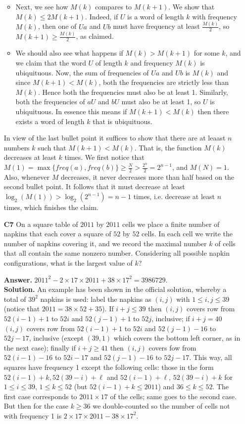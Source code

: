 \documentclass[11pt,a4paper]{article}
\begin{document}
\begin{enumerate}
\begin{itemize}
		\item Next, we see how $M(k)$ compares to $M(k+1)$. We show that $M(k)\le 2M(k+1)$. Indeed, if $U$ is a word of length $k$ with frequency $M(k)$, then one of $Ua$ and $Ub$ must have frequency at least $\frac{M(k)}{2}$, so $M(k+1)\ge \frac{M(k)}{2}$, as claimed. 
		
		\item We should also see what happens if $M(k)>M(k+1)$ for some $k$, and we claim that the word $U$ of length $k$ and frequency $M(k)$ is ubiquituous. Now, the sum of frequencies of $Ua$ and $Ub$ is $M(k)$ and since $M(k+1)<M(k)$, both the frequencies are strictly less than $M(k)$. 
		Hence both the frequencies must also be at least 1. Similarly, both the frequencies of $aU$ and $bU$ must also be at least 1, so $U$ is ubiquituous. In essence this means if $M(k+1)<M(k)$ then there exists a word of length $k$ that is ubiquituous. 
		
	\end{itemize}
	In view of the last bullet point it suffices to show that there are at leaast $n$ numbers $k$ such that $M(k+1)<M(k)$. That is, the function $M(k)$ decreases at least $k$ times. We first notice that $M(1)=\max \{freq(a), freq(b)\}\ge \frac{N}{2}>\frac{2^n}{2}=2^{n-1}$, and $M(N)=1$. Also, whenever $M$ decreases, it never decreases more than half based on the second bullet point. It follows that it must decrease at least $\log_2(M(1))>\log_2(2^{n-1})=n-1$ times, i.e. decrease at least $n$ times, which finishes the claim. 
	
	\item[\textbf{C7}] On a square table of $2011$ by $2011$ cells we place a finite number of napkins that each cover a square of $52$ by $52$ cells. In each cell we write the number of napkins covering it, and we record the maximal number $k$ of cells that all contain the same nonzero number. Considering all possible napkin configurations, what is the largest value of $k$?
	
	\textbf{Answer.} $2011^2-2\times 17\times 2011 + 38 \times 17^2 = 3986729$. \\
	\textbf{Solution.} An example has been shown in the official solution, whereby a total of $39^2$ napkins is used: label the napkins as $(i, j)$ with $1\le i, j\le 39$ (notice that $2011=38\times 52+35$). If $i+j\le 39$ then $(i, j)$ covers row from $52(i-1)+1$ to $52i$ and $52(j-1)+1$ to $52j$, inclusive; 
	if $i+j=40$ $(i, j)$ covers row from $52(i-1)+1$ to $52i$ and $52(j-1)-16$ to $52j-17$, inclusive (except $(39, 1)$ which covers the bottom left corner, as in the next case); finally if $i+j\ge 41$ then $(i, j)$ covers fow from $52(i-1)-16$ to $52i-17$ and $52(j-1)-16$ to $52j-17$. 
	This way, all squares have frequency 1 except the following cells: those in the form $52(i-1)+k, 52(39-i)+\ell$ and $52(i-1)+\ell$, $52(39-i)+k$ for $1\le i\le 39$, $1\le k\le 52$ (but $52(i-1)+k\le 2011$) and $36\le k\le 52$. 
	The first case corresponds to $2011\times 17$ of the cells; same goes to the second case. But then for the case $k\ge 36$ we double-counted so the number of cells not with frequency 1 is $2\times 17\times 2011-38\times 17^2$. 
	

\end{enumerate}
\end{document}

